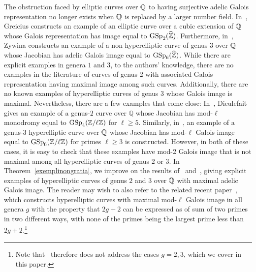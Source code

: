 The obstruction faced by elliptic curves over $\mathbb Q$ to having surjective adelic Galois representation no longer exists when $\mathbb Q$ is replaced by a larger number field. 
In~\cite{greasy}, Greicius constructs an example of an elliptic curve over a cubic extension of ${\mathbb Q}$ whose Galois representation
has image equal to $\operatorname{GSp}_2(\widehat{\mathbb Z})$.
Furthermore, in~\cite{seaweed}, Zywina constructs an example of a non-hyperelliptic curve of genus $3$ over ${\mathbb Q}$ whose Jacobian has adelic Galois image equal to $\operatorname{GSp}_6(\widehat{\mathbb Z})$. 
While there are explicit examples in genera $1$ and $3$, to the authors' knowledge,
there are no examples in the literature of curves of genus 
$2$ with associated Galois representation having maximal image among such curves.
Additionally, there are no known examples of hyperelliptic curves of genus $3$ whose Galois image is maximal.
Nevertheless, there are a few examples that come close:
	In~\cite[Theorem 5.4]{dooleyfat},
	Dieulefait gives an example of a
	genus-$2$ curve over $\mathbb Q$
	whose Jacobian has mod-$\ell$
	monodromy equal to $\operatorname{GSp}_4(\mathbb Z/\ell \mathbb Z)$
	for $\ell \ge 5$.
	Similarly, in~\cite[Corollary 1.1]{anni2016residual},
	an example of a genus-$3$ hyperelliptic curve
	over ${\mathbb Q}$ whose Jacobian has mod-$\ell$ Galois image equal to $\operatorname{GSp}_6(\mathbb Z/\ell \mathbb Z)$
	for primes $\ell \geq 3$ is constructed.
	However, in both of these cases, it is easy to check 
	that these examples have mod-2
	Galois image that is not maximal
	among all hyperelliptic curves of genus
	$2$ or $3$.
	In Theorem~\ref{exemplinongratia},
	we improve on the results of~\cite{dooleyfat} and~\cite{anni2016residual},
	giving explicit examples of hyperelliptic
	curves of genus $2$ and $3$ over $\mathbb Q$ with maximal adelic Galois image.
	The reader may wish to also refer to the related recent paper~\cite{anni2017constructing}, which constructs
	hyperelliptic curves with maximal mod-$\ell$ Galois image in all genera $g$ with the property that $2g+2$ can be expressed as of sum of two primes in two different ways, with none of the primes being the largest prime less than $2g + 2$.\footnote{Note that~\cite{anni2017constructing}
	therefore does not address the cases $g = 2, 3$,
	which we cover in this paper.}

